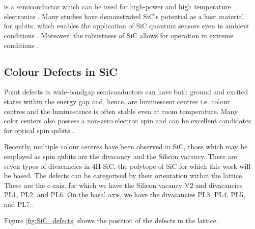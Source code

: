 \section{}\label{SiC}

 is a semiconductor which can be used for high-power and high temperature electronics \cite{Eddy2009,CASADY19961409}. Many studies have demonstrated SiC's potential as a host material for qubits, which enables the application of SiC quantum sensors even in ambient conditions \cite{PhysRevApplied.6.034001}. Moreover, 
the robustness of SiC allows for operation in extreme conditions
\cite{Cochrane2016}
.

\subsection{Colour Defects in SiC}
Point defects in wide-bandgap semiconductors can have both ground and excited states within the energy gap and, hence, are luminescent centres i.e. colour centres and the luminescence is often stable even at room temperature. 
Many color centers also possess a non-zero electron spin and can be excellent candidates for optical spin qubits \cite{Son2021}.

Recently, multiple colour centres have been observed in SiC, those which may be employed as spin qubits are the divacancy and the Silicon vacancy. 
There are seven types of divacancies in 4H-SiC, the polytope of SiC for which this work will be based. 
The defects can be categorised by their orientation within the lattice. 
These are the c-axis, for which we have the Silicon vacancy V2 and divacancies PL1, PL2, and PL6. 
On the basal axis, we have the divacancies PL3, PL4, PL5, and PL7 \cite{Qin-Yue}. 

Figure \ref{fig:SiC_defects} shows the position of the defects in the lattice. 

